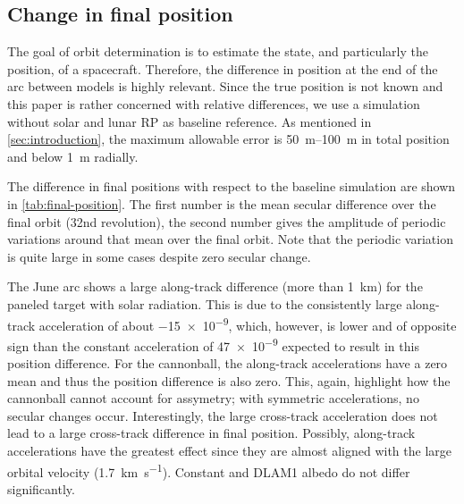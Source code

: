 \subsection{Change in final position}
The goal of orbit determination is to estimate the state, and particularly the position, of a spacecraft. Therefore, the difference in position at the end of the arc between models is highly relevant. Since the true position is not known and this paper is rather concerned with relative differences, we use a simulation without solar and lunar \gls{RP} as baseline reference. As mentioned in \cref{sec:introduction}, the maximum allowable error is \qtyrange{50}{100}{\m} in total position and below \qty{1}{\m} radially.

\begin{table}[t]
    \caption{Difference of final position in \unit{\m} with respect to no-\gls{RP} baseline, given as mean over the final orbit plus/minus periodic variations around that mean in the final orbit. The largest changes are in the along-track position. $\mathbf{A}$: solar only; $\mathbf{B}$: lunar only (thermal + constant albedo); $\mathbf{C}$: lunar only (thermal + \gls{DLAM1} albedo); $\mathbf{D}$: solar + lunar (thermal + \gls{DLAM1} albedo).}
    \label{tab:final-position}
    \begin{subtable}[c]{\textwidth}
        
     \end{subtable}

     \medskip

     \begin{subtable}[c]{\textwidth}
        
     \end{subtable}
\end{table}

The difference in final positions with respect to the baseline simulation are shown in \cref{tab:final-position}. The first number is the mean secular difference over the final orbit (32nd revolution), the second number gives the amplitude of periodic variations around that mean over the final orbit. Note that the periodic variation is quite large in some cases despite zero secular change.

The June arc shows a large along-track difference (more than \qty{1}{\km}) for the paneled target with solar radiation. This is due to the consistently large along-track acceleration of about \qty{-15e-9}{\acc}, which, however, is lower and of opposite sign than the constant acceleration of \qty{47e-9}{\acc} expected to result in this position difference. For the cannonball, the along-track accelerations have a zero mean and thus the position difference is also zero. This, again, highlight how the cannonball cannot account for assymetry; with symmetric accelerations, no secular changes occur. Interestingly, the large cross-track acceleration does not lead to a large cross-track difference in final position. Possibly, along-track accelerations have the greatest effect since they are almost aligned with the large orbital velocity (\qty{1.7}{\km\per\s}). Constant and \gls{DLAM1} albedo do not differ significantly.

